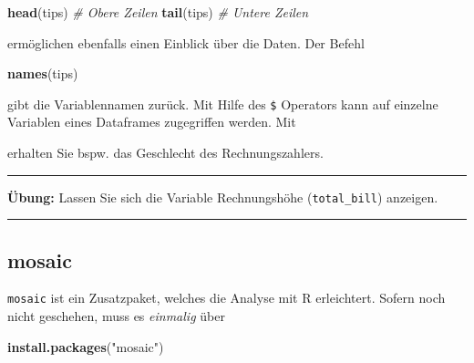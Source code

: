 \documentclass[12pt,ngerman,paper=a4,pagesize,DIV=13]{scrreprt}
\newenvironment{Shaded}{\begin{snugshade}}{\end{snugshade}}
\newcommand{\CommentTok}[1]{\textcolor[rgb]{0.56,0.35,0.01}{\textit{#1}}}
\newcommand{\KeywordTok}[1]{\textcolor[rgb]{0.13,0.29,0.53}{\textbf{#1}}}
\newcommand{\NormalTok}[1]{#1}
\newcommand{\OperatorTok}[1]{\textcolor[rgb]{0.81,0.36,0.00}{\textbf{#1}}}
\newcommand{\StringTok}[1]{\textcolor[rgb]{0.31,0.60,0.02}{#1}}
\begin{document}
\begin{Shaded}
\begin{Highlighting}[]
\KeywordTok{head}\NormalTok{(tips) }\CommentTok{# Obere Zeilen}
\KeywordTok{tail}\NormalTok{(tips) }\CommentTok{# Untere Zeilen }
\end{Highlighting}
\end{Shaded}

ermöglichen ebenfalls einen Einblick über die Daten. Der Befehl

\begin{Shaded}
\begin{Highlighting}[]
\KeywordTok{names}\NormalTok{(tips)}
\end{Highlighting}
\end{Shaded}

gibt die Variablennamen zurück. Mit Hilfe des \texttt{\$} Operators kann
auf einzelne Variablen eines Dataframes zugegriffen werden. Mit

\begin{Shaded}
\end{Shaded}

erhalten Sie bspw. das Geschlecht des Rechnungszahlers.

\begin{center}\rule{0.5\linewidth}{\linethickness}\end{center}

\textbf{Übung:} Lassen Sie sich die Variable Rechnungshöhe
(\texttt{total\_bill}) anzeigen.

\begin{center}\rule{0.5\linewidth}{\linethickness}\end{center}

\hypertarget{mosaic}{%
\subsection{mosaic}\label{mosaic}}

\texttt{mosaic} ist ein Zusatzpaket, welches die Analyse mit R
erleichtert. Sofern noch nicht geschehen, muss es \emph{einmalig} über

\begin{Shaded}
\begin{Highlighting}[]
\KeywordTok{install.packages}\NormalTok{(}\StringTok{"mosaic"}\NormalTok{)}
\end{Highlighting}
\end{Shaded}
\end{document}

